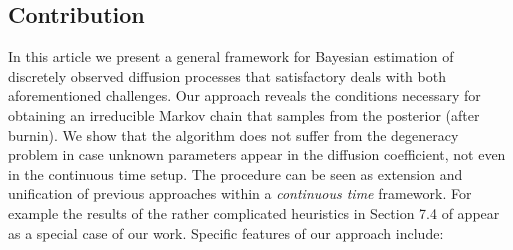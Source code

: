 \documentclass[preprint]{imsart}
\theoremstyle{definition}
\begin{document}
\subsection{Contribution} In this article we present a general framework for Bayesian estimation of discretely observed diffusion processes that  satisfactory deals with both aforementioned challenges. Our approach reveals the conditions necessary for obtaining an irreducible Markov chain that samples from the posterior  (after burnin). We show that the algorithm does not suffer from the degeneracy problem in case unknown parameters appear in the diffusion coefficient, not even in the continuous time setup.  The procedure can be seen as extension and unification of previous approaches within a {\it continuous time} framework.
For example the results of the rather complicated heuristics in Section 7.4 of \cite{Fuchs} appear as a special case of our work.  Specific features of our approach include: 
\end{document}

